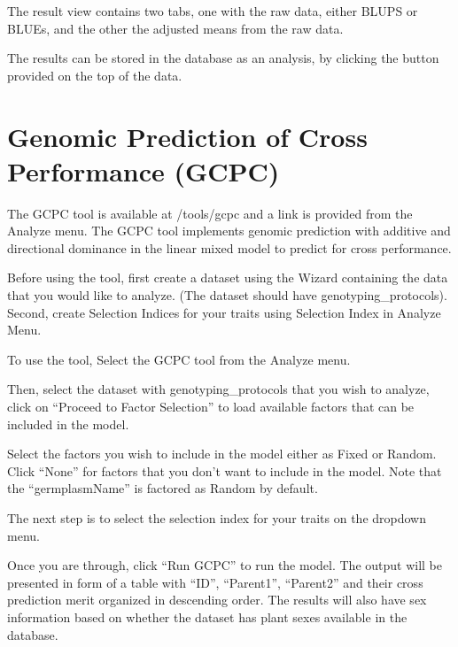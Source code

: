 \documentclass[
  12pt,
]{book}
\begin{document}
The result view contains two tabs, one with the raw data, either BLUPS or BLUEs, and the other the adjusted means from the raw data.

The results can be stored in the database as an analysis, by clicking the button provided on the top of the data.

\hypertarget{genomic-prediction-of-cross-performance-gcpc}{%
\section{Genomic Prediction of Cross Performance (GCPC)}\label{genomic-prediction-of-cross-performance-gcpc}}

The GCPC tool is available at /tools/gcpc and a link is provided from the Analyze menu. The GCPC tool implements genomic prediction with additive and directional dominance in the linear mixed model to predict for cross performance.

Before using the tool, first create a dataset using the Wizard containing the data that you would like to analyze. (The dataset should have genotyping\_protocols). Second, create Selection Indices for your traits using Selection Index in Analyze Menu.

To use the tool, Select the GCPC tool from the Analyze menu.

Then, select the dataset with genotyping\_protocols that you wish to analyze, click on ``Proceed to Factor Selection'' to load available factors that can be included in the model.

Select the factors you wish to include in the model either as Fixed or Random. Click ``None'' for factors that you don't want to include in the model. Note that the ``germplasmName'' is factored as Random by default.

The next step is to select the selection index for your traits on the dropdown menu.

Once you are through, click ``Run GCPC'' to run the model. The output will be presented in form of a table with ``ID'', ``Parent1'', ``Parent2'' and their cross prediction merit organized in descending order. The results will also have sex information based on whether the dataset has plant sexes available in the database.
\end{document}
